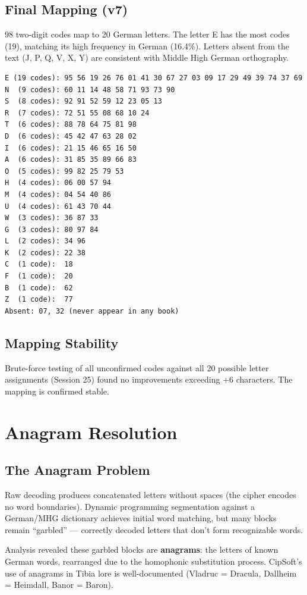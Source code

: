 \documentclass[11pt,a4paper]{article}
\begin{document}
\subsection{Final Mapping (v7)}

98 two-digit codes map to 20 German letters. The letter E has the most codes (19), matching its high frequency in German (16.4\%). Letters absent from the text (J, P, Q, V, X, Y) are consistent with Middle High German orthography.

\begin{lstlisting}[style=plain]
E (19 codes): 95 56 19 26 76 01 41 30 67 27 03 09 17 29 49 39 74 37 69
N  (9 codes): 60 11 14 48 58 71 93 73 90
S  (8 codes): 92 91 52 59 12 23 05 13
R  (7 codes): 72 51 55 08 68 10 24
T  (6 codes): 88 78 64 75 81 98
D  (6 codes): 45 42 47 63 28 02
I  (6 codes): 21 15 46 65 16 50
A  (6 codes): 31 85 35 89 66 83
O  (5 codes): 99 82 25 79 53
H  (4 codes): 06 00 57 94
M  (4 codes): 04 54 40 86
U  (4 codes): 61 43 70 44
W  (3 codes): 36 87 33
G  (3 codes): 80 97 84
L  (2 codes): 34 96
K  (2 codes): 22 38
C  (1 code):  18
F  (1 code):  20
B  (1 code):  62
Z  (1 code):  77
Absent: 07, 32 (never appear in any book)
\end{lstlisting}

\subsection{Mapping Stability}

Brute-force testing of all unconfirmed codes against all 20 possible letter assignments (Session 25) found no improvements exceeding +6 characters. The mapping is confirmed stable.

\section{Anagram Resolution}

\subsection{The Anagram Problem}

Raw decoding produces concatenated letters without spaces (the cipher encodes no word boundaries). Dynamic programming segmentation against a German/MHG dictionary achieves initial word matching, but many blocks remain ``garbled'' --- correctly decoded letters that don't form recognizable words.

Analysis revealed these garbled blocks are \textbf{anagrams}: the letters of known German words, rearranged due to the homophonic substitution process. CipSoft's use of anagrams in Tibia lore is well-documented (Vladruc = Dracula, Dallheim = Heimdall, Banor = Baron).
\end{document}
